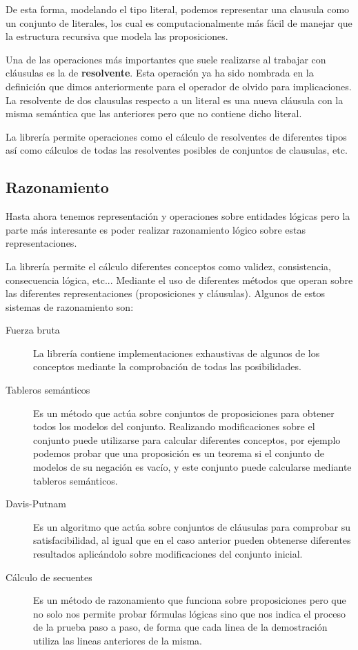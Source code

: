 	De esta forma, modelando el tipo literal, podemos representar una clausula como un conjunto de literales, los cual es computacionalmente más fácil de manejar que la estructura recursiva que modela las proposiciones.
	
	Una de las operaciones más importantes que suele realizarse al trabajar con cláusulas es la de \textbf{resolvente}. Esta operación ya ha sido nombrada en la definición que dimos anteriormente para el operador de olvido para implicaciones. La resolvente de dos clausulas respecto a un literal es una nueva cláusula con la misma semántica que las anteriores pero que no contiene dicho literal. 
	
	La librería permite operaciones como el cálculo de resolventes de diferentes tipos así como cálculos de todas las resolventes posibles de conjuntos de clausulas, etc.
	

\subsection*{Razonamiento}

	Hasta ahora tenemos representación y operaciones sobre entidades lógicas pero la parte más interesante es poder realizar razonamiento lógico sobre estas representaciones.	
	
	La librería permite el cálculo diferentes conceptos como validez, consistencia, consecuencia lógica, etc... Mediante el uso de diferentes métodos que operan sobre las diferentes representaciones (proposiciones y cláusulas). Algunos de estos sistemas de razonamiento son:
	
	\begin{description}
		\item[Fuerza bruta] La librería contiene implementaciones exhaustivas de algunos de los conceptos mediante la comprobación de todas las posibilidades.
		\item[Tableros semánticos] Es un método que actúa sobre conjuntos de proposiciones para obtener todos los modelos del conjunto. Realizando modificaciones sobre el conjunto puede utilizarse para calcular diferentes conceptos, por ejemplo podemos probar que una proposición es un teorema si el conjunto de modelos de su negación es vacío, y este conjunto puede calcularse mediante tableros semánticos.
		\item[Davis-Putnam] Es un algoritmo que actúa sobre conjuntos de cláusulas para comprobar su satisfacibilidad, al igual que en el caso anterior pueden obtenerse diferentes resultados aplicándolo sobre modificaciones del conjunto inicial.
		\item[Cálculo de secuentes] Es un método de razonamiento que funciona sobre proposiciones pero que no solo nos permite probar fórmulas lógicas sino que nos indica el proceso de la prueba paso a paso, de forma que cada linea de la demostración utiliza las lineas anteriores de la misma.
	\end{description}

